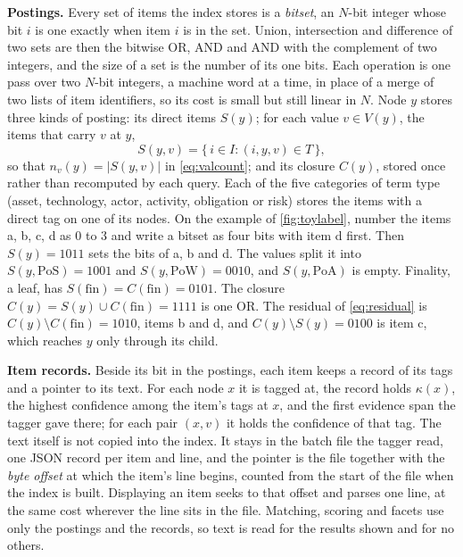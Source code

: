 \textbf{Postings.} Every set of items the index stores is a \emph{bitset},
an $N$-bit integer whose bit $i$ is one exactly when item $i$ is in the set.
Union, intersection and difference of two sets are then the bitwise OR, AND
and AND with the complement of two integers, and the size of a set is the
number of its one bits. Each operation is one pass over two $N$-bit
integers, a machine word at a time, in place of a merge of two lists of item
identifiers, so its cost is small but still linear in $N$. Node $y$ stores
three kinds of posting: its direct items $S(y)$; for each value $v \in V(y)$,
the items that carry $v$ at $y$,
\begin{equation}
  \label{eq:pair}
  S(y, v) = \{\, i \in I : (i, y, v) \in T \,\},
\end{equation}
so that $n_v(y) = |S(y, v)|$ in \cref{eq:valcount}; and its closure $C(y)$,
stored once rather than recomputed by each query. Each of the five
categories of term type (asset, technology, actor, activity, obligation or
risk) stores the items with a direct tag on one of its nodes. On the example
of \cref{fig:toylabel}, number the items a, b, c, d as 0 to 3 and write a
bitset as four bits with item d first. Then $S(y) = 1011$ sets the bits of
a, b and d. The values split it into $S(y, \text{PoS}) = 1001$ and
$S(y, \text{PoW}) = 0010$, and $S(y, \text{PoA})$ is empty. Finality, a
leaf, has $S(\mathrm{fin}) = C(\mathrm{fin}) = 0101$. The closure
$C(y) = S(y) \cup C(\mathrm{fin}) = 1111$ is one OR. The residual of
\cref{eq:residual} is $C(y) \setminus C(\mathrm{fin}) = 1010$, items b and d,
and $C(y) \setminus S(y) = 0100$ is item c, which reaches $y$ only through
its child.

\textbf{Item records.} Beside its bit in the postings, each item keeps a
record of its tags and a pointer to its text. For each node $x$ it is
tagged at, the record holds $\kappa(x)$, the highest confidence among the
item's tags at $x$, and the first evidence span the tagger gave there; for
each pair $(x, v)$ it holds the confidence of that tag. The text itself is
not copied into the index. It stays in the batch file the tagger read, one
JSON record per item and line, and the pointer is the file together with the
\emph{byte offset} at which the item's line begins, counted from the start of
the file when the index is built. Displaying an item seeks to that offset and
parses one line, at the same cost wherever the line sits in the file.
Matching, scoring and facets use only the postings and the records, so text
is read for the results shown and for no others.

